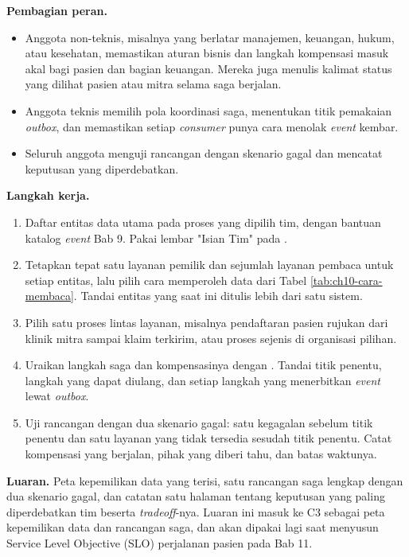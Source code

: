 \textbf{Pembagian peran.}
\begin{itemize}
  \item Anggota non-teknis, misalnya yang berlatar manajemen, keuangan, hukum, atau kesehatan,
        memastikan aturan bisnis dan langkah kompensasi masuk akal bagi pasien dan bagian keuangan.
        Mereka juga menulis kalimat status yang dilihat pasien atau mitra selama saga berjalan.
  \item Anggota teknis memilih pola koordinasi saga, menentukan titik pemakaian \textit{outbox},
        dan memastikan setiap \textit{consumer} punya cara menolak \textit{event} kembar.
  \item Seluruh anggota menguji rancangan dengan skenario gagal dan mencatat keputusan yang
        diperdebatkan.
\end{itemize}

\textbf{Langkah kerja.}
\begin{enumerate}
  \item Daftar entitas data utama pada proses yang dipilih tim, dengan bantuan katalog
        \textit{event} Bab 9. Pakai lembar "Isian Tim" pada
        .
  \item Tetapkan tepat satu layanan pemilik dan sejumlah layanan pembaca untuk setiap entitas, lalu
        pilih cara memperoleh data dari Tabel \ref{tab:ch10-cara-membaca}. Tandai entitas yang saat
        ini ditulis lebih dari satu sistem.
  \item Pilih satu proses lintas layanan, misalnya pendaftaran pasien rujukan dari klinik mitra
        sampai klaim terkirim, atau proses sejenis di organisasi pilihan.
  \item Uraikan langkah saga dan kompensasinya dengan
        . Tandai titik penentu, langkah yang
        dapat diulang, dan setiap langkah yang menerbitkan \textit{event} lewat \textit{outbox}.
  \item Uji rancangan dengan dua skenario gagal: satu kegagalan sebelum titik penentu dan satu
        layanan yang tidak tersedia sesudah titik penentu. Catat kompensasi yang berjalan, pihak
        yang diberi tahu, dan batas waktunya.
\end{enumerate}

\textbf{Luaran.} Peta kepemilikan data yang terisi, satu rancangan saga lengkap dengan dua skenario
gagal, dan catatan satu halaman tentang keputusan yang paling diperdebatkan tim beserta
\textit{tradeoff}-nya. Luaran ini masuk ke C3 sebagai peta kepemilikan data dan rancangan saga, dan
akan dipakai lagi saat menyusun Service Level Objective (SLO) perjalanan pasien pada Bab 11.


